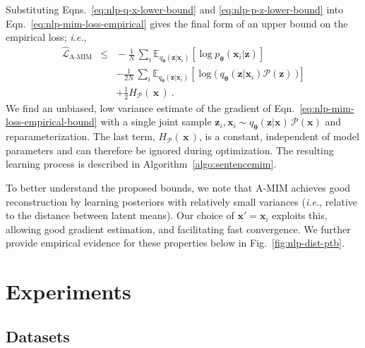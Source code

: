 \documentclass{article}
\newcommand{\bs}{\boldsymbol}
\newcommand{\ie}{{\em i.e.}}
\newcommand{\x}{{\bs{x}}}
\newcommand{\z}{{\bs z}}
\newcommand{\params}{{\bs \theta}}
\newcommand{\pjoint}{\mathcal{P}}
\newcommand{\pdec}{p}
\newcommand{\penc}{q}
\newcommand{\Mdec}{\pdec_{\params}}
\newcommand{\Menc}{\penc_{\params}}
\newcommand{\EAMIMloss}{\hat{\mathcal{L}}_\text{A-MIM}}
\newcommand{\E}[2]{\mathbb{E}_{#1}\left[#2\right]}
\newcommand{\HD}[2]{H_{#1} \left( \, #2 \, \right)}
\newcommand{\Penc}{\Menc(\z | \x)\, \pjoint(\x)}
\begin{document}
Substituting Eqns.\ \eqref{eq:nlp-q-x-lower-bound} and \eqref{eq:nlp-p-z-lower-bound}
into Eqn.\ \eqref{eq:nlp-mim-loss-empirical} gives the final form of an
upper bound on the empirical loss; \ie,
\begin{eqnarray}
    \EAMIMloss \!\!
    & \le & \!\! -\frac{1}{N} \, \sum_{i} \E{\Menc(\z |\x_i)}{\log \Mdec(\x_i|\z)}  \nonumber \\
    & & -\frac{1}{2N} \, \sum_{i} \E{\Menc(\z |\x_i)}{\log \big( ~ \Menc(\z|\x_i) \pjoint(\z) ~ \big) } \nonumber \\
    & & + \frac{1}{2}\HD{\pjoint}{\x} ~. \label{eq:nlp-mim-loss-empirical-bound}
\end{eqnarray}
We find an unbiased, low variance estimate of the gradient of Eqn.\ \eqref{eq:nlp-mim-loss-empirical-bound}
with a single joint sample $\z_i, \x_i \sim \Penc$ and reparameterization.
The last term, $\HD{\pjoint}{\x}$, is a constant, independent of model parameters
and can therefore be ignored during optimization.
The resulting learning process is described in Algorithm\ \ref{algo:sentencemim}.

To better understand the proposed bounds, we note that A-MIM achieves good
reconstruction by learning posteriors with relatively small variances
(\ie, relative to the distance between latent means).
Our choice of $\x'=\x_i$ exploits this, allowing good gradient estimation,
and facilitating fast convergence.
We further provide empirical evidence for these properties below in Fig.\ \ref{fig:nlp-dist-ptb}.































 \section{Experiments} \label{sec:nlp-experiments}


\subsection{Datasets} \label{sec:nlp-datasets}
\end{document}
